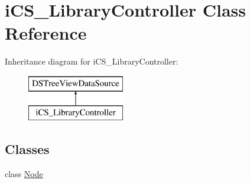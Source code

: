 \hypertarget{classi_c_s___library_controller}{\section{i\+C\+S\+\_\+\+Library\+Controller Class Reference}
\label{classi_c_s___library_controller}
}
Inheritance diagram for i\+C\+S\+\_\+\+Library\+Controller\+:\begin{figure}[H]
\begin{center}
\leavevmode
\includegraphics[height=2.000000cm]{classi_c_s___library_controller}
\end{center}
\end{figure}
\subsection*{Classes}
\begin{DoxyCompactItemize}
\item 
class \hyperlink{classi_c_s___library_controller_1_1_node}{Node}
\end{DoxyCompactItemize}
